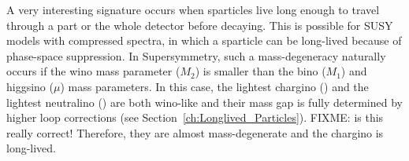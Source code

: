 
A very interesting signature occurs when sparticles live long enough to travel through a part or the whole detector before decaying.
This is possible for SUSY models with compressed spectra, in which a sparticle can be long-lived because of phase-space suppression.
In Supersymmetry, such a mass-degeneracy naturally occurs if the wino mass parameter ($M_2$) is smaller than the bino ($M_1$) and higgsino ($\mu$) mass parameters.
In this case, the lightest chargino (\chipm) and the lightest neutralino (\chiO) are both wino-like and their mass gap is fully determined by higher loop corrections (see Section~\ref{ch:Longlived_Particles}). FIXME: is this really correct!
Therefore, they are almost mass-degenerate and the chargino is long-lived.

